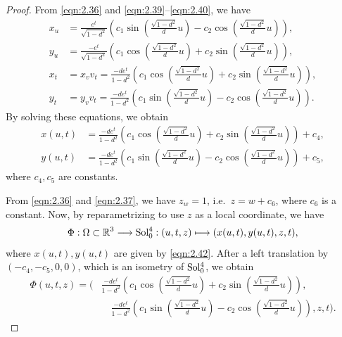 \documentclass[reqno]{amsart}%
\theoremstyle{definition}
\numberwithin{equation}{section}
\begin{document}
\begin{proof}
		From \eqref{eqn:2.36} and \eqref{eqn:2.39}--\eqref{eqn:2.40}, we have
		\begin{equation*}
			\begin{aligned}
				x_u
				&=\frac{e^t}{\sqrt{1-d^2}}
				\left(c_1\sin\left(\tfrac{\sqrt{1-d^2}}{d}u\right)-c_2\cos\left(\tfrac{\sqrt{1-d^2}}{d}u\right)\right),\\
				y_u
				&=\frac{-e^t}{\sqrt{1-d^2}}
				\left(c_1\cos\left(\tfrac{\sqrt{1-d^2}}{d}u\right)+c_2\sin\left(\tfrac{\sqrt{1-d^2}}{d}u\right)\right),\\
				x_t
				&=x_v v_t
				=\frac{-de^t}{1-d^2}
				\left(c_1\cos\left(\tfrac{\sqrt{1-d^2}}{d}u\right)+c_2\sin\left(\tfrac{\sqrt{1-d^2}}{d}u\right)\right),\\
				y_t
				&=y_v v_t
				=\frac{-de^t}{1-d^2}
				\left(c_1\sin\left(\tfrac{\sqrt{1-d^2}}{d}u\right)-c_2\cos\left(\tfrac{\sqrt{1-d^2}}{d}u\right)\right).
			\end{aligned}
		\end{equation*}
		By solving these equations, we obtain
		\begin{equation}\label{eqn:2.42}
			\begin{aligned}
				x(u,t) &= \frac{-de^t}{1-d^2}\left(c_1\cos\left(\tfrac{\sqrt{1-d^2}}{d}u\right)+c_2\sin\left(\tfrac{\sqrt{1-d^2}}{d}u\right)\right)+c_4,\\
				y(u,t) &= \frac{-de^t}{1-d^2}\left(c_1\sin\left(\tfrac{\sqrt{1-d^2}}{d}u\right)-c_2\cos\left(\tfrac{\sqrt{1-d^2}}{d}u\right)\right)+c_5,
			\end{aligned}
		\end{equation}
		where $c_4, c_5$ are constants.
		
		From \eqref{eqn:2.36} and \eqref{eqn:2.37}, we have $z_w=1$, i.e.\ 
		$z=w+c_6$, where $c_6$ is a constant.
		Now, by reparametrizing to use $z$ as a local coordinate, we have
		\begin{equation*}
			\begin{aligned}
				\Phi:\Omega\subset\mathbb{R}^3 \longrightarrow {\rm Sol_0^4}:
				(u,t,z)\longmapsto (x(u,t),y(u,t),z,t),
			\end{aligned}
		\end{equation*}
		where $x(u,t), y(u,t)$ are given by \eqref{eqn:2.42}.
		After a left translation by $(-c_4,-c_5,0,0)$,
		which is an isometry of ${\rm Sol_0^4}$, we obtain
		\begin{equation*}
			\begin{aligned}
				\Phi(u,t,z)
				=\Bigg(&\frac{-de^t}{1-d^2}\left(c_1\cos\left(\tfrac{\sqrt{1-d^2}}{d}u\right)
				+c_2\sin\left(\tfrac{\sqrt{1-d^2}}{d}u\right)\right), \\
				&\quad \frac{-de^t}{1-d^2}\left(c_1\sin\left(\tfrac{\sqrt{1-d^2}}{d}u\right)
				-c_2\cos\left(\tfrac{\sqrt{1-d^2}}{d}u\right)\right)
				,z,t\Bigg).
			\end{aligned}
		\end{equation*}
		

\end{proof}
\end{document}
